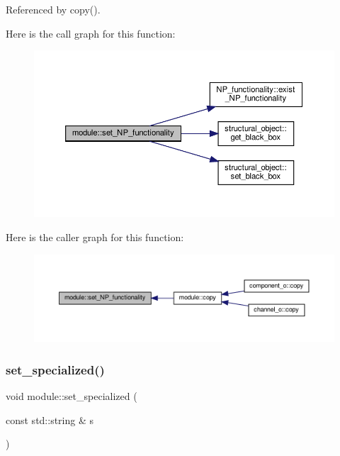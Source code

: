 Referenced by copy().

Here is the call graph for this function\+:
\nopagebreak
\begin{figure}[H]
\begin{center}
\leavevmode
\includegraphics[width=350pt]{d0/dd3/classmodule_a50873fd8528c6a212048c39e6578c9bd_cgraph}
\end{center}
\end{figure}
Here is the caller graph for this function\+:
\nopagebreak
\begin{figure}[H]
\begin{center}
\leavevmode
\includegraphics[width=350pt]{d0/dd3/classmodule_a50873fd8528c6a212048c39e6578c9bd_icgraph}
\end{center}
\end{figure}
\mbox{\label{classmodule_a164a8dcd5335b2da7b0a06acdaa97daf}} 
\subsubsection{\texorpdfstring{set\+\_\+specialized()}{set\_specialized()}}
{\footnotesize\ttfamily void module\+::set\+\_\+specialized (\begin{DoxyParamCaption}\item[{const std\+::string \&}]{s }\end{DoxyParamCaption})\hspace{0.3cm}{\ttfamily [inline]}}



